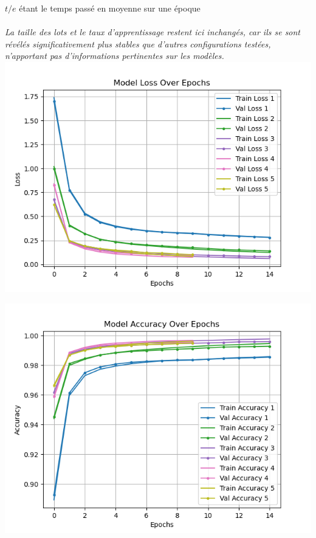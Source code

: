 \begin{multicols}{2}
{$t/e$ étant le temps passé en moyenne sur une époque \\
} \\
\textit{La taille des lots et le taux d’apprentissage restent ici inchangés, car ils se sont révélés significativement plus stables 
que d'autres configurations testées, n'apportant pas d’informations pertinentes sur les modèles.} \\


\includegraphics[width=\columnwidth]{images/mnist_losses.png}
\hfill\break

\includegraphics[width=\columnwidth]{images/mnist_accuracies.png}
\hfill\break


\end{multicols}
